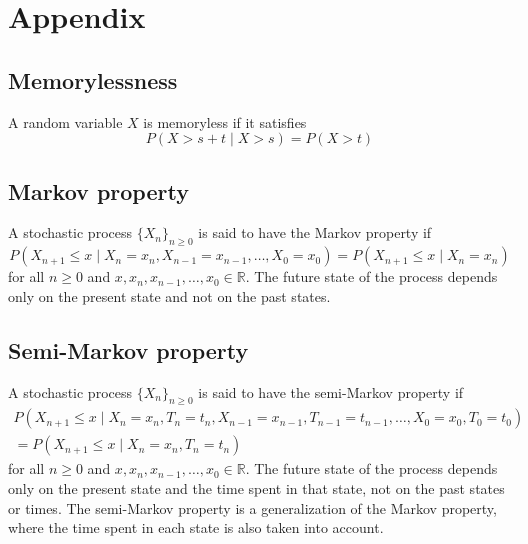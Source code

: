 \section{Appendix}

\subsection{Memorylessness}

A random variable \( X \) is memoryless if it satisfies
\begin{equation}
    P(X > s + t \mid X > s) = P(X > t)
\end{equation}

\subsection{Markov property}

A stochastic process \( {\{ X_n \}}_{n \geq 0} \) is said to have the Markov property if
\begin{equation}
    P(X_{n+1} \leq x \mid X_n = x_n, X_{n-1} = x_{n-1}, \ldots, X_0 = x_0) = P(X_{n+1} \leq x \mid X_n = x_n)
\end{equation}
for all \( n \geq 0 \) and \( x, x_n, x_{n-1}, \ldots, x_0 \in \mathbb{R} \).
The future state of the process depends only on the present state and not on the past states.

\subsection{Semi-Markov property}

A stochastic process \( {\{ X_n \}}_{n \geq 0} \) is said to have the semi-Markov property if
\begin{equation}
    \begin{aligned}
        P(X_{n+1} \leq x \mid X_n = x_n, T_n = t_n, X_{n-1} = x_{n-1}, T_{n-1} = t_{n-1}, \ldots, X_0 = x_0, T_0 = t_0)
        \\ =
        P(X_{n+1} \leq x \mid X_n = x_n, T_n = t_n)
    \end{aligned}
\end{equation}
for all \( n \geq 0 \) and \( x, x_n, x_{n-1}, \ldots, x_0 \in \mathbb{R} \).
The future state of the process depends only on the present state and the time spent in that state, not on the past states or times.
The semi-Markov property is a generalization of the Markov property, where the time spent in each state is also taken into account.

